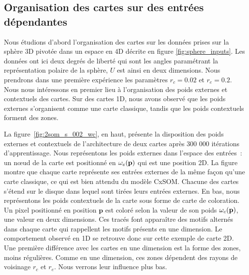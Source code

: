 \documentclass[../main]{subfiles}
\begin{document}
\subsection{Organisation des cartes sur des entrées dépendantes}

Nous étudions d'abord l'organisation des cartes sur les données prises sur la sphère 3D pivotée dans un espace en 4D décrite en figure \ref{fig:sphere_inputs}. Les données ont ici deux degrés de liberté qui sont les angles paramétrant la représentation polaire de la sphère, $U$ est ainsi en deux dimensions. 
Nous prendrons dans une première expérience les paramètres $r_c = 0.02$ et $r_e = 0.2$.
Nous nous intéressons en premier lieu à l'organisation des poids externes et contextuels des cartes. Sur des cartes 1D, nous avons observé que les poids externes s'organisent comme une carte classique, tandis que les poids contextuels forment des zones.

La figure~\ref{fig:2som_s_002_wc}, en haut, présente la disposition des poids externes et contextuels de l'architecture de deux cartes après 300 000 itérations d'apprentissage.
Nous représentons les poids externes dans l'espace des entrées~: un n\oe{}ud de la carte est positionné en $\omega_e(\mathbf{p})$ qui est une position 2D.
La figure  montre que chaque carte représente ses entrées externes de la même façon qu'une carte classique, ce qui est bien attendu du modèle CxSOM. Chacune des cartes s'étend sur le disque dans lequel sont tirées leurs entrées externes.
En bas, nous représentons les poids contextuels de la carte sous forme de carte de coloration. Un pixel positionné en position $\mathbf{p}$ est coloré selon la valeur de son poids $\omega_c(\mathbf{p})$, une valeur en deux dimensions.
Ces tracés font apparaître des motifs alternés dans chaque carte qui rappellent les motifs présents en une dimension. Le comportement observé en 1D se retrouve donc sur cette exemple de carte 2D.
Une première différence avec les cartes en une dimension est la forme des zones, moins régulières. Comme en une dimension, ces zones dépendent des rayons de voisinage $r_c$ et $r_e$. Nous verrons leur influence plus bas. 
\end{document}
